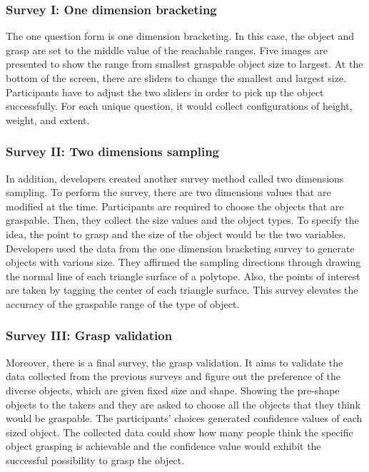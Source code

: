 \documentclass[letterpaper,10pt,fleqn,draftclsnofoot,onecolumn]{IEEEtran}
\begin{document}
{	\subsubsection{Survey I: One dimension bracketing}
The one question form is one dimension bracketing. In this case, the object and grasp are set to the middle value of the reachable ranges. Five images are presented to show the range from smallest graspable object size to largest. At the bottom of the screen, there are sliders to change the smallest and largest size. Participants have to adjust the two sliders in order to pick up the object successfully. For each unique question, it would collect configurations of height, weight, and extent. \newline
    
    \subsubsection{Survey II: Two dimensions sampling}
In addition, developers created another survey method called two dimensions sampling. To perform the survey, there are two dimensions values that are modified at the time. Participants are required to choose the objects that are graspable. Then, they collect the size values and the object types. To specify the idea, the point to grasp and the size of the object would be the two variables. Developers used the data from the one dimension bracketing survey to generate objects with various size. They affirmed the sampling directions through drawing the normal line of each triangle surface of a polytope. Also, the points of interest are taken by tagging the center of each triangle surface. This survey elevates the accuracy of the graspable range of the type of object. \newline

\subsubsection{Survey III: Grasp validation}
Moreover, there is a final survey, the grasp validation. It aims to validate the data collected from the previous surveys and figure out the preference of the diverse objects, which are given fixed size and shape. Showing the pre-shape objects to the takers and they are asked to choose all the objects that they think would be graspable. The participants’ choices generated confidence values of each sized object. The collected data could show how many people think the specific object grasping is achievable and the confidence value would exhibit the successful possibility to grasp the object. \newline
	
}
\end{document}
